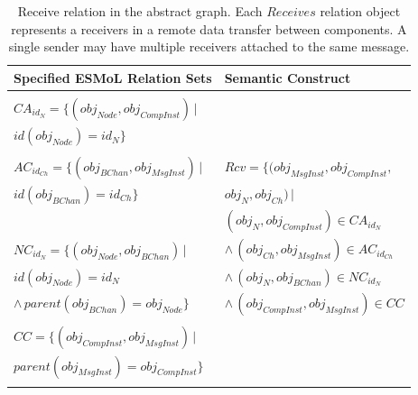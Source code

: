 \begin{table}
\centering

\begin{tabular}[width=0.5\columnwidth]{ | l | l | }
 \hline
 \textbf{Specified ESMoL Relation Sets} & \textbf{Semantic
Construct} \\
 \hline \hline
                                                                        & \\
 $CA_{id_N} = \{ (obj_{Node}, obj_{CompInst} ) \, |$                    & \\
 \hspace{1.7cm} $ id(obj_{Node}) = id_N \} $                            & \\
                                                                        & \\
 $AC_{id_{Ch}} = \{ (obj_{BChan}, obj_{MsgInst} ) \, |$          
   & 
$ Rcv = \{(obj_{MsgInst}, obj_{CompInst}, $  \\
 \hspace{1.6cm} $id(obj_{BChan}) = id_{Ch} \} $                         & 
\hspace{1.3cm} $obj_{N}, obj_{Ch}) \, |$ \\
                                                                        &  
\hspace{0.8cm} $(obj_{N}, obj_{CompInst}) \in CA_{id_N}$ \\
 $NC_{id_N} = \{ (obj_{Node}, obj_{BChan}) \, | $                       & 
\hspace{0.5cm} $ \wedge \, (obj_{Ch}, obj_{MsgInst}) \in AC_{id_{Ch}}$ \\
 \hspace{1.35cm} $id(obj_{Node}) = id_N $                               &
\hspace{0.5cm} $ \wedge \, (obj_{N}, obj_{BChan}) \in NC_{id_N}$ \\ 
 \hspace{1cm} $ \wedge \, parent(obj_{BChan} ) = obj_{Node} \}$         &
\hspace{0.5cm} $ \wedge \, (obj_{CompInst}, obj_{MsgInst}) \in CC $ \\
                                                                        & \\
 $CC = \{ (obj_{CompInst}, obj_{MsgInst} ) \, | $                       & \\
 \hspace{0.7cm} $parent(obj_{MsgInst} ) = obj_{CompInst} \}$            & \\ 
                                                                        & \\
 \hline
\end{tabular}
	\caption{Receive relation in the abstract graph.  Each $Receives$
relation object represents a receivers in a remote data transfer between
components. A single sender may have multiple receivers attached to the same
message.}
	\label{tab:receive}
\end{table}

